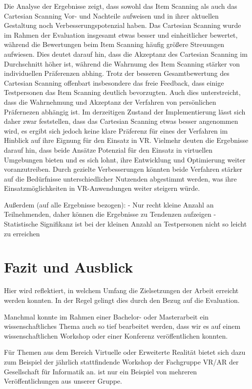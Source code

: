 Die Analyse der Ergebnisse zeigt, dass sowohl das Item Scanning als auch das Cartesian Scanning Vor- und Nachteile aufweisen und in ihrer aktuellen Gestaltung noch Verbesserungspotenzial haben. Das Cartesian Scanning wurde im Rahmen der Evaluation insgesamt etwas besser und einheitlicher bewertet, während die Bewertungen beim Item Scanning häufig größere Streuungen aufwiesen. Dies deutet darauf hin, dass die Akzeptanz des Cartesian Scanning im Durchschnitt höher ist, während die Wahrnumg des Item Scanning stärker von individuellen Präferenzen abhing.
Trotz der besseren Gesamtbewertung des Cartesian Scanning offenbart insbesondere das freie Feedback, dass einige Testpersonen das Item Scanning deutlich bevorzugten. Auch dies unterstreicht, dass die Wahrnehmung und Akzeptanz der Verfahren von persönlichen Präfernezen abhängig ist.
Im derzeitigen Zustand der Implementierung lässt sich daher zwar feststellen, dass das Cartesian Scanning etwas besser angenommen wird, es ergibt sich jedoch keine klare Präferenz für eines der Verfahren im Hinblick auf ihre Eignung für den Einsatz in VR. Vielmehr deuten die Ergebnisse darauf hin, dass beide Ansätze Potenzial für den Einsatz in virtuellen Umgebungen bieten und es sich lohnt, ihre Entwicklung und Optimierung weiter voranzutreiben. Durch gezielte Verbesserungen könnten beide Verfahren stärker auf die Bedürfnisse unterschiedlicher Nutzenden abgestimmt werden, was ihre Einsatzmöglichkeiten in VR-Anwendungen weiter steigern würde.



 

Außerdem (auf alle Ergebnisse bezogen):
-	Nur recht kleine Anzahl an Teilnehmenden, daher können die Ergebnisse zu Tendenzen aufzeigen 
-	Statistische Signifikanz ist bei der kleinen Anzahl an Testpersonen nicht so leicht zu erreichen 




\section{Fazit und Ausblick}
Hier wird reflektiert, in welchem Umfang die Zielsetzungen der Arbeit erreicht werden konnten. In der Regel gelingt dies durch den Bezug auf die Evaluation.




Manchmal konnte im Rahmen einer Bachelor- oder Masterarbeit ein
wissenschaftliches Thema auch so tief bearbeitet werden, dass wir es auf einem
wissenschaftlichen Workshop oder einer Konferenz veröffentlichen konnten.

Für Themen aus dem Bereich Virtuelle oder Erweiterte Realität bietet sich dazu
zum Beispiel der jährlich stattfindende Workshop der Fachgruppe VR/AR der
Gesellschaft für Informatik an. \citet{Bluhm:Sonar:2009} ist nur ein Beispiel
von mehreren Veröffentlichungen aus unserer Gruppe.



